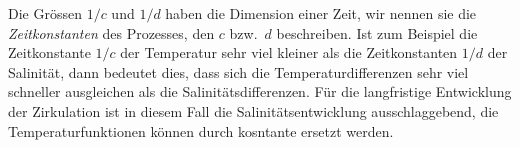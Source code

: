 Die Grössen $1/c$ und $1/d$ haben die Dimension einer Zeit, wir nennen
sie die {\em Zeitkonstanten} des Prozesses, den $c$ bzw.~$d$ beschreiben.
Ist zum Beispiel die Zeitkonstante $1/c$ der Temperatur sehr viel kleiner
als die Zeitkonstanten $1/d$ der Salinität, dann bedeutet dies, dass
sich die Temperaturdifferenzen sehr viel schneller ausgleichen als die
Salinitätsdifferenzen.
Für die langfristige Entwicklung der Zirkulation ist in diesem Fall
die Salinitätsentwicklung ausschlaggebend, die Temperaturfunktionen
können durch kosntante ersetzt werden.




